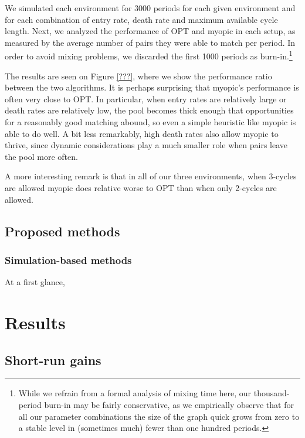 \documentclass[12pt]{article}
\begin{document}
We simulated each environment for 3000 periods for each given environment and for each combination of entry rate, death rate and maximum available cycle length. Next, we analyzed the performance of OPT and myopic in each setup, as measured by the average number of pairs they were able to match per period. In order to avoid mixing problems, we discarded the first 1000 periods as burn-in.\footnote{While we refrain from a formal analysis of mixing time here, our thousand-period burn-in may be fairly conservative, as we empirically observe that for all our parameter combinations the size of the graph quick grows from zero to a stable level in (sometimes much) fewer than one hundred periods.}

The results are seen on Figure \ref{???}, where we show the performance ratio between the two algorithms. It is perhaps surprising that myopic's performance is often very close to OPT. In particular, when entry rates are relatively large or death rates are relatively low, the pool becomes thick enough that  opportunities for a reasonably good matching abound, so even a simple heuristic like myopic is able to do well. A bit less remarkably, high death rates also allow myopic to thrive, since dynamic considerations play a much smaller role when pairs leave the pool more often.

A more interesting remark is that in all of our three environments, when 3-cycles are allowed myopic does relative worse to OPT than when only 2-cycles are allowed. 

\subsection{Proposed methods}

\subsubsection{Simulation-based methods}

At a first glance, 



\section{Results} \label{sec:results}



\subsection{Short-run gains}
\end{document}
